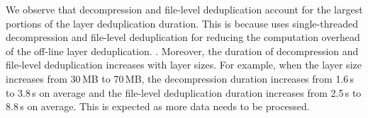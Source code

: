 We observe that decompression and file-level deduplication account for the largest portions of
the layer deduplication duration.
%
%
This is because \sysname uses single-threaded decompression and file-level deduplication for
reducing the computation overhead of the off-line layer deduplication.
%
.
%
Moreover, the duration of decompression and file-level deduplication increases with layer sizes.
%
For example, when the layer size increases from 30\,MB to 70\,MB, 
the decompression duration increases from 1.6\,s to 3.8\,s on average and the file-level deduplication duration increases from 2.5\,s to 8.8\,s on average.
%
This is expected as more data needs to be processed.


